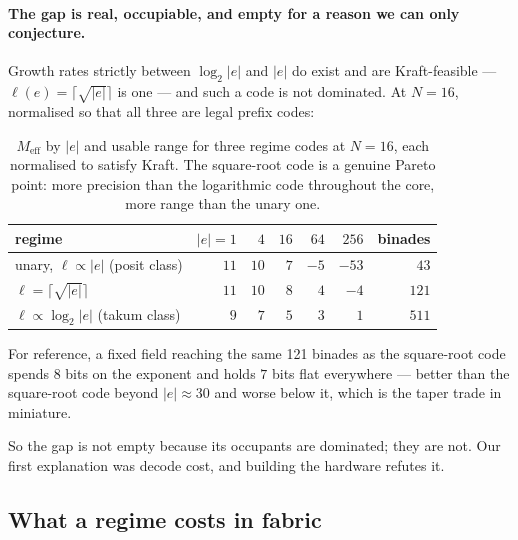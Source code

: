 \paragraph{The gap is real, occupiable, and empty for a reason we can only
conjecture.} Growth rates strictly between $\log_2|e|$ and $|e|$ do exist and are
Kraft-feasible --- $\ell(e) = \lceil\sqrt{|e|}\rceil$ is one --- and such a code
is not dominated. At $N = 16$, normalised so that all three are legal prefix
codes:

\begin{table}[t]\centering
\caption{$M_{\mathrm{eff}}$ by $|e|$ and usable range for three regime codes at
$N = 16$, each normalised to satisfy Kraft. The square-root code is a genuine
Pareto point: more precision than the logarithmic code throughout the core, more
range than the unary one.}
\label{tab:codes}
\begin{tabular}{lrrrrrr}
\toprule
regime & $|e|{=}1$ & $4$ & $16$ & $64$ & $256$ & binades \\
\midrule
unary, $\ell \propto |e|$ (posit class)      & $11$ & $10$ & $7$ & $-5$ & $-53$ & $43$ \\
$\ell = \lceil\sqrt{|e|}\rceil$              & $11$ & $10$ & $8$ & $4$  & $-4$  & $121$ \\
$\ell \propto \log_2|e|$ (takum class)       & $9$  & $7$  & $5$ & $3$  & $1$   & $511$ \\
\bottomrule
\end{tabular}
\end{table}

For reference, a fixed field reaching the same 121 binades as the square-root code
spends 8 bits on the exponent and holds $7$ bits flat everywhere --- better than
the square-root code beyond $|e| \approx 30$ and worse below it, which is the
taper trade in miniature.

So the gap is not empty because its occupants are dominated; they are not. Our
first explanation was decode cost, and building the hardware refutes it.


\subsection{What a regime costs in fabric}\label{sec:regimecost}


